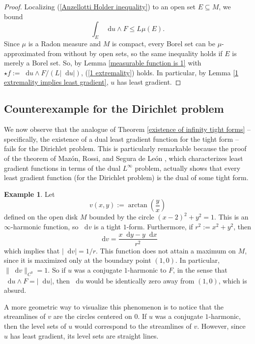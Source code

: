 \documentclass[reqno,11pt]{amsart}
\newcommand*\dif{\mathop{}\!\mathrm{d}}
\theoremstyle{definition}
\newtheorem{example}[theorem]{Example}
\numberwithin{equation}{section}
\begin{document}
\begin{proof}
Localizing (\ref{Anzellotti Holder inequality}) to an open set $E \subseteq M$, we bound
$$\int_E \dif u \wedge F \leq L \mu(E).$$
Since $\mu$ is a Radon measure and $M$ is compact, every Borel set can be $\mu$-approximated from without by open sets, so the same inequality holds if $E$ is merely a Borel set.
So, by Lemma \ref{measurable function is 1} with $\star f := \dif u \wedge F/(L|\dif u|)$, (\ref{1 extremality}) holds.
In particular, by Lemma \ref{1 extremality implies least gradient}, $u$ has least gradient.
\end{proof}

\subsection{Counterexample for the Dirichlet problem}
We now observe that the analogue of Theorem \ref{existence of infinity tight forms} -- specifically, the existence of a dual least gradient function for the tight form -- fails for the Dirichlet problem.
This is particularly remarkable because the proof of the theorem of Maz\'on, Rossi, and Segura de Le\'on \cite{Mazon14}, which characterizes least gradient functions in terms of the dual $L^\infty$ problem, actually shows that every least gradient function (for the Dirichlet problem) is the dual of some tight form.

\begin{example}\label{boundaries bad}
Let
$$v(x, y) := \arctan\left(\frac{y}{x}\right)$$
defined on the open disk $M$ bounded by the circle $(x - 2)^2 + y^2 = 1$.
This is an $\infty$-harmonic function, so $\dif v$ is a tight $1$-form.
Furthermore, if $r^2 := x^2 + y^2$, then
$$\dif v = \frac{x \dif y - y \dif x}{r^2}$$
which implies that $|\dif v| = 1/r$.
This function does not attain a maximum on $M$, since it is maximized only at the boundary point $(1, 0)$.
In particular, $\|\dif v\|_{C^0} = 1$.
So if $u$ was a conjugate $1$-harmonic to $F$, in the sense that $\dif u \wedge F = |\dif u|$, then $\dif u$ would be identically zero away from $(1, 0)$, which is absurd.

A more geometric way to visualize this phenomenon is to notice that the streamlines of $v$ are the circles centered on $0$.
If $u$ was a conjugate $1$-harmonic, then the level sets of $u$ would correspond to the streamlines of $v$.
However, since $u$ has least gradient, its level sets are straight lines.
\end{example}
\end{document}
